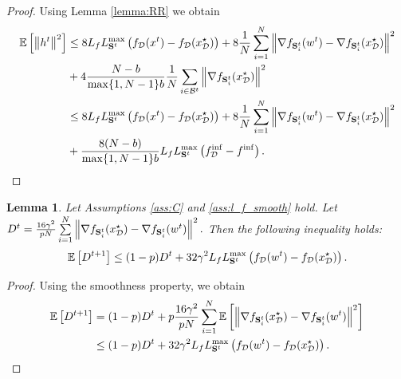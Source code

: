 \documentclass{article}
\newcommand{\bb}{\mathbb}
\newcommand{\cD}{\mathcal{D}}
\newcommand{\Exp}[1]{{\bb E}\left[#1\right]}
\newtheorem{lemma}{Lemma}
\theoremstyle{plain}
\newcommand{\tf}{f_{\mathcal{D}}}
\newcommand{\mS}{{\bf S}}
\theoremstyle{plain}
\theoremstyle{definition}
\theoremstyle{remark}
\begin{document}
\begin{proof}
Using Lemma \ref{lemma:RR} we obtain
\begin{align*}
    \Exp{\left\|h^t\right\|^2} &\leq 8L_fL_{\mS^t}^{\max}\left(\tf(x^t) - \tf(x_\cD^\star)\right) + 8 \frac{1}{N}\sum_{i = 1}^{N}\left\|\nabla f_{\mS^t_i}(w^t) - \nabla f_{\mS^t_i}(x_\cD^\star)\right\|^2\\
    &+ 4\frac{N-b}{\max\{1,N-1\}b} \frac{1}{N} \sum_{i\in\mathcal{B}^t}\left\|\nabla f_{\mS^t_i}(x_\cD^\star)\right\|^2\\
    &\leq 8L_fL_{\mS^t}^{\max}\left(\tf(x^t) - \tf(x_\cD^\star)\right) + 8 \frac{1}{N}\sum_{i = 1}^{N}\left\|\nabla f_{\mS^t_i}(w^t) - \nabla f_{\mS^t_i}(x_\cD^\star)\right\|^2\\
    &+ \frac{8(N-b)}{\max\{1,N-1\}b} L_fL_{\mS^t}^{\max}\left(\tf^{\inf} - f^{\inf}\right).
\end{align*}
\end{proof}

\begin{lemma}
\label{lemma:prob-lsvrg}
	Let Assumptions \ref{ass:C} and \ref{ass:l_f_smooth} hold.     Let $D^t = \frac{16\gamma^2}{pN}\sum \limits_{i=1}^N\left\|\nabla f_{\mS^t_i}(x_\cD^\star) - \nabla f_{\mS^t_i}(w^t)\right\|^2.$ Then the following inequality holds:
    \begin{equation*}
	\begin{split}
		\Exp{D^{t+1}} \leq (1-p)D^t + 32\gamma^2L_fL_{\mS^t}^{\max}\left(\tf(w^t) - \tf(x_\cD^\star)\right).
	\end{split}
\end{equation*}
\end{lemma}
\begin{proof}
Using the smoothness property, we obtain
    \begin{equation*}
	\begin{split}
		\Exp{D^{t+1}} & = (1-p)D^t + p\frac{16\gamma^2}{pN}\sum_{i=1}^{N}\Exp{\left\|\nabla f_{\mS^t_i}(x_\cD^\star) - \nabla f_{\mS^t_i}(w^t)\right\|^2}\\
		& \leq (1-p)D^t + 32\gamma^2L_fL_{\mS^t}^{\max}\left(\tf(w^t) - \tf(x_\cD^\star)\right).
	\end{split}
\end{equation*}
\end{proof}
\end{document}
